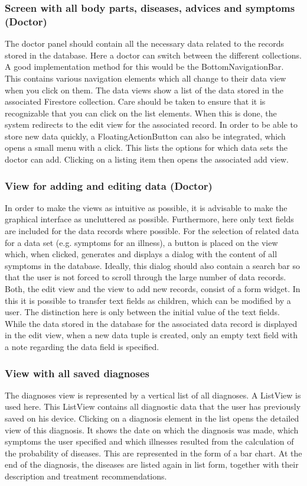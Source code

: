 \subsubsection{\textbf{Screen with all body parts, diseases, advices and symptoms (Doctor)}}
The doctor panel should contain all the necessary data related to the records stored in the database. Here a doctor can switch between the different collections. A good implementation method for this would be the BottomNavigationBar. This contains various navigation elements which all change to their data view when you click on them. The data views show a list of the data stored in the associated Firestore collection. Care should be taken to ensure that it is recognizable that you can click on the list elements. When this is done, the system redirects to the edit view for the associated record. In order to be able to store new data quickly, a FloatingActionButton can also be integrated, which opens a small menu with a click. This lists the options for which data sets the doctor can add. Clicking on a listing item then opens the associated add view.
\subsubsection{\textbf{View for adding and editing data (Doctor)}}
In order to make the views as intuitive as possible, it is advisable to make the graphical interface as uncluttered as possible. Furthermore, here only text fields are included for the data records where possible. For the selection of related data for a data set (e.g. symptoms for an illness), a button is placed on the view which, when clicked, generates and displays a dialog with the content of all symptoms in the database. Ideally, this dialog should also contain a search bar so that the user is not forced to scroll through the large number of data records. Both, the edit view and the view to add new records, consist of a form widget. In this it is possible to transfer text fields as children, which can be modified by a user. The distinction here is only between the initial value of the text fields. While the data stored in the database for the associated data record is displayed in the edit view, when a new data tuple is created, only an empty text field with a note regarding the data field is specified.
\subsubsection{\textbf{View with all saved diagnoses}}
The diagnoses view is represented by a vertical list of all diagnoses. A ListView is used here. This ListView contains all diagnostic data that the user has previously saved on his device. Clicking on a diagnosis element in the list opens the detailed view of this diagnosis. It shows the date on which the diagnosis was made, which symptoms the user specified and which illnesses resulted from the calculation of the probability of diseases. This are represented in the form of a bar chart. At the end of the diagnosis, the diseases are listed again in list form, together with their description and treatment recommendations.

